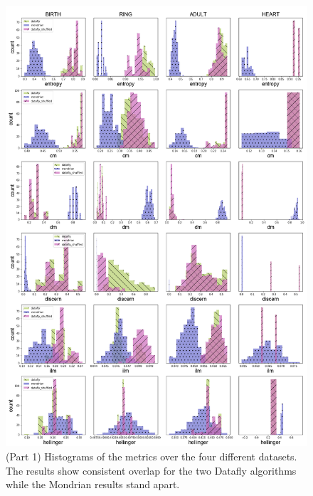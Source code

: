 \begin{figure}
    \centerfloat
    \includegraphics[width=\textwidth]{project/fig/metrics_hist_1.png}
    \caption{(Part 1) Histograms of the metrics over the four different datasets. The results show consistent overlap for the two Datafly algorithms while the Mondrian results stand apart.}
    \label{fig:metric_hist1}
\end{figure}
